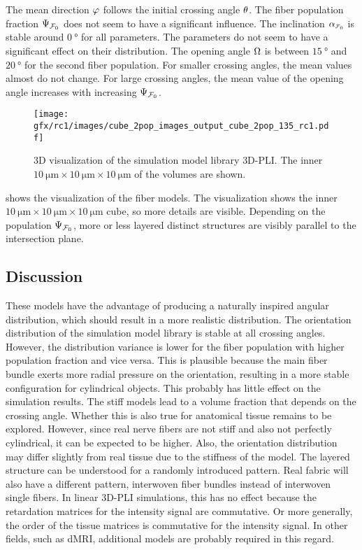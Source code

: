 \par
% 
The mean direction $\textnormal{$\varphi$}$ follows the initial crossing angle $\textnormal{$\theta$}$.
The fiber population fraction $\textnormal{$\Psi_{\textnormal{$\mathcal{F}_0$}}$}$ does not seem to have a significant influence. 
The inclination $\modelInc$ is stable around $\SI{0}{\degree}$ for all parameters.
The parameters do not seem to have a significant effect on their distribution.
The opening angle $\textnormal{$\Omega$}$ is between $\SI{15}{\degree}$ and $\SI{20}{\degree}$ for the second fiber population.
For smaller crossing angles, the mean values almost do not change.
For large crossing angles, the mean value of the opening angle increases with increasing $\textnormal{$\Psi_{\textnormal{$\mathcal{F}_0$}}$}$.
\par
%
\begin{figure}[!t]
\centering
\texttt{[image: gfx/rc1/images/cube\_2pop\_images\_output\_cube\_2pop\_135\_rc1.pdf]}
\caption{3D visualization of the simulation model library \ac{3D-PLI}.
The inner $\SI{10}{\micro\meter} \times \SI{10}{\micro\meter} \times \SI{10}{\micro\meter}$ of the volumes are shown.}
\label{fig:modelImages}
\end{figure}
% 
 shows the visualization of the fiber models.
The visualization shows the inner $\SI{10}{\micro\meter} \times \SI{10}{\micro\meter} \times \SI{10}{\micro\meter}$ cube, so more details are visible.
Depending on the population $\textnormal{$\Psi_{\textnormal{$\mathcal{F}_0$}}$}$, more or less layered distinct structures are visibly parallel to the intersection plane.
\par
% 
%
% 
% 
\subsection{Discussion}
% 
These models have the advantage of producing a naturally inspired angular distribution, which should result in a more realistic distribution.
The orientation distribution of the simulation model library is stable at all crossing angles.
However, the distribution variance is lower for the fiber population with higher population fraction and vice versa.
This is plausible because the main fiber bundle exerts more radial pressure on the orientation, resulting in a more stable configuration for cylindrical objects.
This probably has little effect on the simulation results.
The stiff models lead to a volume fraction that depends on the crossing angle.
Whether this is also true for anatomical tissue remains to be explored.
However, since real nerve fibers are not stiff and also not perfectly cylindrical, it can be expected to be higher.
Also, the orientation distribution may differ slightly from real tissue due to the stiffness of the model.
The layered structure can be understood for a randomly introduced pattern.
Real fabric will also have a different pattern, \eg{} interwoven fiber bundles instead of interwoven single fibers.
In linear \ac{3D-PLI} simulations, this has no effect because the retardation matrices for the intensity signal are commutative.
Or more generally, the order of the tissue matrices is commutative for the intensity signal.
In other fields, such as \ac{dMRI}, additional models are probably required in this regard.
% 
%
%
